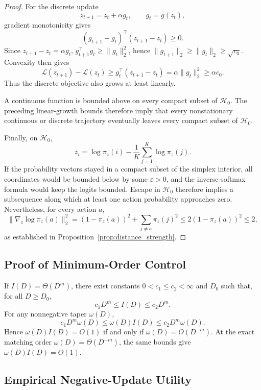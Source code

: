 \documentclass{article}
\theoremstyle{plain}
\theoremstyle{definition}
\theoremstyle{remark}
\begin{document}
\begin{proof}
For the discrete update
\[
z_{t+1}=z_t+\alpha g_t,
\qquad
g_t=g(z_t),
\]
gradient monotonicity gives
\[
(g_{t+1}-g_t)^\top(z_{t+1}-z_t)\ge0.
\]
Since \(z_{t+1}-z_t=\alpha g_t\),
\(g_{t+1}^\top g_t\ge\|g_t\|_2^2\), hence
\(\|g_{t+1}\|_2\ge\|g_t\|_2\ge\sqrt{c_0}\). Convexity then gives
\[
\mathcal L(z_{t+1})-\mathcal L(z_t)
\ge
g_t^\top(z_{t+1}-z_t)
=
\alpha\|g_t\|_2^2
\ge
\alpha c_0.
\]
Thus the discrete objective also grows at least linearly.

A continuous function is bounded above on every compact subset of
\(\mathcal H_0\). The preceding linear-growth bounds therefore imply
that every nonstationary continuous or discrete trajectory eventually
leaves every compact subset of \(\mathcal H_0\).

Finally, on \(\mathcal H_0\),
\[
z_i
=
\log\pi_z(i)
-
\frac1K\sum_{j=1}^K\log\pi_z(j).
\]
If the probability vectors stayed in a compact subset of the simplex
interior, all coordinates would be bounded below by some
\(\varepsilon>0\), and the inverse-softmax formula would keep the logits
bounded. Escape in \(\mathcal H_0\) therefore implies a subsequence along
which at least one action probability approaches zero. Nevertheless,
for every action \(a\),
\[
\|\nabla_z\log\pi_z(a)\|_2^2
=
(1-\pi_z(a))^2+\sum_{j\ne a}\pi_z(j)^2
\le
2(1-\pi_z(a))^2
\le2,
\]
as established in Proposition~\ref{prop:distance_strength}.
\end{proof}

\subsection{Proof of Minimum-Order Control}
\label{app:min_order_control}

If \(I(D)=\Theta(D^m)\), there exist constants
\(0<c_1\le c_2<\infty\) and \(D_0\) such that, for all \(D\ge D_0\),
\[
    c_1D^m \le I(D) \le c_2D^m.
\]
For any nonnegative taper \(\omega(D)\),
\[
    c_1D^m\omega(D)
    \le
    \omega(D)I(D)
    \le
    c_2D^m\omega(D).
\]
Hence \(\omega(D)I(D)=O(1)\) if and only if
\(\omega(D)=O(D^{-m})\). At the exact matching order
\(\omega(D)=\Theta(D^{-m})\), the same bounds give
\(\omega(D)I(D)=\Theta(1)\).

\subsection{Empirical Negative-Update Utility}
\label{app:negative_update_utility}
\end{document}
